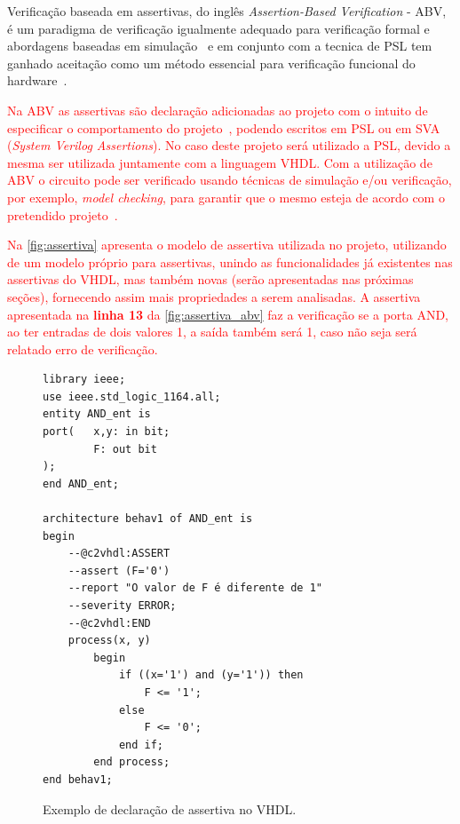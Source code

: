 Verificação baseada em assertivas, do inglês \textit{Assertion-Based Verification} - ABV, é um paradigma de verificação igualmente adequado para verificação formal e abordagens baseadas em simulação~\cite{boule2005incorporating} e em conjunto com a tecnica de PSL tem ganhado aceitação como um método essencial para verificação funcional do hardware~\cite{DahanCombining}.

\par
\textcolor{red}{Na ABV as assertivas são declaração adicionadas ao projeto com o intuito de especificar o comportamento do projeto~\cite{boule2005incorporating}, podendo escritos em PSL ou em SVA (\textit{System Verilog Assertions}). No caso deste projeto será utilizado a PSL, devido a mesma ser utilizada juntamente com a linguagem VHDL. Com a utilização de ABV o circuito pode ser verificado usando técnicas de simulação e/ou verificação, por exemplo, \textit{model checking}, para garantir que o mesmo esteja de acordo com o pretendido projeto~\cite{DahanCombining}.}

\par
\textcolor{red}{Na \autoref{fig:assertiva} apresenta o modelo de assertiva utilizada no projeto, utilizando de um modelo próprio para assertivas, unindo as funcionalidades já existentes nas assertivas do VHDL, mas também novas (serão apresentadas nas próximas seções), fornecendo assim mais propriedades a serem analisadas. A assertiva apresentada na \textbf{linha 13} da \autoref{fig:assertiva_abv} faz a verificação se a porta AND, ao ter entradas de dois valores 1, a saída também será 1, caso não seja será relatado erro de verificação.}

\begin{figure}[H]
\caption{\label{fig:assertiva_abv} Exemplo de declaração de assertiva no VHDL.}
	\begin{center}
    \begin{minipage}{0.9\textwidth}
    \begin{lstlisting}       
library ieee;
use ieee.std_logic_1164.all;
entity AND_ent is
port(   x,y: in bit;
        F: out bit
);
end AND_ent;

architecture behav1 of AND_ent is
begin
	--@c2vhdl:ASSERT
    --assert (F='0')
    --report "O valor de F é diferente de 1"
    --severity ERROR;
    --@c2vhdl:END
	process(x, y)
    	begin
        	if ((x='1') and (y='1')) then
            	F <= '1';
        	else
            	F <= '0';
        	end if;
    	end process;
end behav1;

\end{lstlisting}
    \end{minipage}
	\end{center}
\end{figure}

